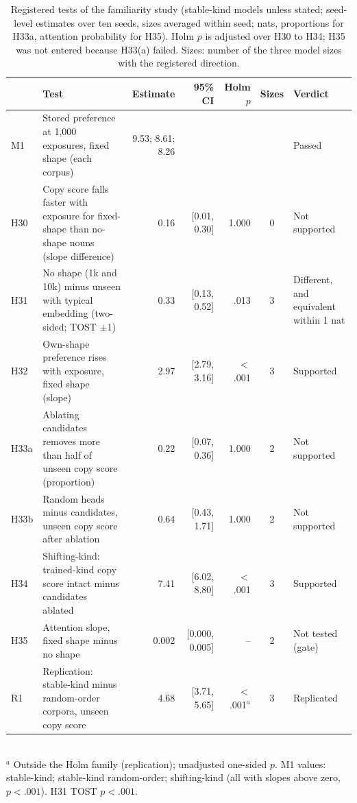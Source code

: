 \begin{table}[!htbp]
\centering\small
\caption{Registered tests of the familiarity study (stable-kind models unless stated; seed-level estimates over ten seeds, sizes averaged within seed; nats, proportions for H33a, attention probability for H35). Holm $p$ is adjusted over H30 to H34; H35 was not entered because H33(a) failed. Sizes: number of the three model sizes with the registered direction.}
\label{tab:M1}
\begin{tabular}{@{}lp{}rrrcp{}@{}}
\toprule
& Test & Estimate & 95\% CI & Holm $p$ & Sizes & Verdict \\
\midrule
M1 & Stored preference at 1,000 exposures, fixed shape (each corpus) & 9.53; 8.61; 8.26 & & & & Passed \\
H30 & Copy score falls faster with exposure for fixed-shape than no-shape nouns (slope difference) & 0.16 & [0.01, 0.30] & 1.000 & 0 & Not supported \\
H31 & No shape (1k and 10k) minus unseen with typical embedding (two-sided; TOST $\pm$1) & 0.33 & [0.13, 0.52] & .013 & 3 & Different, and equivalent within 1 nat \\
H32 & Own-shape preference rises with exposure, fixed shape (slope) & 2.97 & [2.79, 3.16] & $<$.001 & 3 & Supported \\
H33a & Ablating candidates removes more than half of unseen copy score (proportion) & 0.22 & [0.07, 0.36] & 1.000 & 2 & Not supported \\
H33b & Random heads minus candidates, unseen copy score after ablation & 0.64 & [\textminus{}0.43, 1.71] & 1.000 & 2 & Not supported \\
H34 & Shifting-kind: trained-kind copy score intact minus candidates ablated & 7.41 & [6.02, 8.80] & $<$.001 & 3 & Supported \\
H35 & Attention slope, fixed shape minus no shape & 0.002 & [\textminus{}0.000, 0.005] & -- & 2 & Not tested (gate) \\
R1 & Replication: stable-kind minus random-order corpora, unseen copy score & 4.68 & [3.71, 5.65] & $<$.001$^a$ & 3 & Replicated \\
\bottomrule
\end{tabular}
\\[2pt]{\footnotesize $^a$ Outside the Holm family (replication); unadjusted one-sided $p$. M1 values: stable-kind; stable-kind random-order; shifting-kind (all with slopes above zero, $p<.001$). H31 TOST $p<.001$.}
\end{table}

